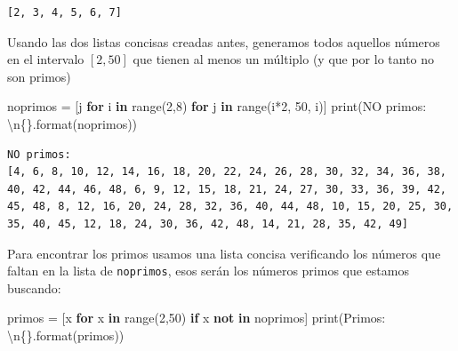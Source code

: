 \documentclass[
  spanish,
  letterpaper,
]{scrbook}
\newenvironment{Shaded}{\begin{snugshade}}{\end{snugshade}}
\newcommand{\BuiltInTok}[1]{\textcolor[rgb]{0.00,0.23,0.31}{#1}}
\newcommand{\CharTok}[1]{\textcolor[rgb]{0.13,0.47,0.30}{#1}}
\newcommand{\ControlFlowTok}[1]{\textcolor[rgb]{0.00,0.23,0.31}{\textbf{#1}}}
\newcommand{\DecValTok}[1]{\textcolor[rgb]{0.68,0.00,0.00}{#1}}
\newcommand{\KeywordTok}[1]{\textcolor[rgb]{0.00,0.23,0.31}{\textbf{#1}}}
\newcommand{\NormalTok}[1]{\textcolor[rgb]{0.00,0.23,0.31}{#1}}
\newcommand{\OperatorTok}[1]{\textcolor[rgb]{0.37,0.37,0.37}{#1}}
\newcommand{\SpecialCharTok}[1]{\textcolor[rgb]{0.37,0.37,0.37}{#1}}
\newcommand{\StringTok}[1]{\textcolor[rgb]{0.13,0.47,0.30}{#1}}
\theoremstyle{definition}
\theoremstyle{remark}
\begin{document}
\begin{verbatim}
[2, 3, 4, 5, 6, 7]
\end{verbatim}

Usando las dos listas concisas creadas antes, generamos todos aquellos
números en el intervalo \([2,50]\) que tienen al menos un múltiplo (y
que por lo tanto no son primos)

\begin{Shaded}
\begin{Highlighting}[]
\NormalTok{noprimos }\OperatorTok{=}\NormalTok{ [j }\ControlFlowTok{for}\NormalTok{ i }\KeywordTok{in} \BuiltInTok{range}\NormalTok{(}\DecValTok{2}\NormalTok{,}\DecValTok{8}\NormalTok{) }\ControlFlowTok{for}\NormalTok{ j }\KeywordTok{in} \BuiltInTok{range}\NormalTok{(i}\OperatorTok{*}\DecValTok{2}\NormalTok{, }\DecValTok{50}\NormalTok{, i)]}
\BuiltInTok{print}\NormalTok{(}\StringTok{\textquotesingle{}NO primos: }\CharTok{\textbackslash{}n}\SpecialCharTok{\{\}}\StringTok{\textquotesingle{}}\NormalTok{.}\BuiltInTok{format}\NormalTok{(noprimos))}
\end{Highlighting}
\end{Shaded}

\begin{verbatim}
NO primos: 
[4, 6, 8, 10, 12, 14, 16, 18, 20, 22, 24, 26, 28, 30, 32, 34, 36, 38, 40, 42, 44, 46, 48, 6, 9, 12, 15, 18, 21, 24, 27, 30, 33, 36, 39, 42, 45, 48, 8, 12, 16, 20, 24, 28, 32, 36, 40, 44, 48, 10, 15, 20, 25, 30, 35, 40, 45, 12, 18, 24, 30, 36, 42, 48, 14, 21, 28, 35, 42, 49]
\end{verbatim}

Para encontrar los primos usamos una lista concisa verificando los
números que faltan en la lista de \texttt{noprimos}, esos serán los
números primos que estamos buscando:

\begin{Shaded}
\begin{Highlighting}[]
\NormalTok{primos }\OperatorTok{=}\NormalTok{ [x }\ControlFlowTok{for}\NormalTok{ x }\KeywordTok{in} \BuiltInTok{range}\NormalTok{(}\DecValTok{2}\NormalTok{,}\DecValTok{50}\NormalTok{) }\ControlFlowTok{if}\NormalTok{ x }\KeywordTok{not} \KeywordTok{in}\NormalTok{ noprimos]}
\BuiltInTok{print}\NormalTok{(}\StringTok{\textquotesingle{}Primos: }\CharTok{\textbackslash{}n}\SpecialCharTok{\{\}}\StringTok{\textquotesingle{}}\NormalTok{.}\BuiltInTok{format}\NormalTok{(primos))}
\end{Highlighting}
\end{Shaded}
\end{document}
